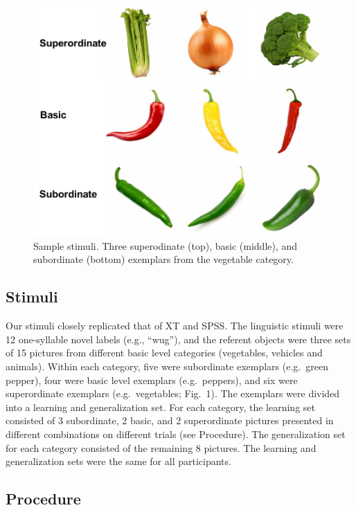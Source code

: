 \documentclass[english,floatsintext,man]{apa6}
\theoremstyle{definition}
\theoremstyle{definition}
\theoremstyle{remark}
\begin{document}
\begin{figure}[t!]
 
 {\centering \includegraphics[width=0.5\linewidth]{figs/stim} 
 
 }
 
 \caption{Sample stimuli. Three superodinate (top), basic (middle), and subordinate (bottom) exemplars from the vegetable category.}\label{fig:unnamed-chunk-1}
 \end{figure}

\subsection{Stimuli}\label{stimuli}

Our stimuli closely replicated that of XT and SPSS. The linguistic
stimuli were 12 one-syllable novel labels (e.g., \enquote{wug}), and the
referent objects were three sets of 15 pictures from different basic
level categories (vegetables, vehicles and animals). Within each
category, five were subordinate exemplars (e.g.~green pepper), four were
basic level exemplars (e.g.~peppers), and six were superordinate
exemplars (e.g.~vegetables; Fig.~1). The exemplars were divided into a
learning and generalization set. For each category, the learning set
consisted of 3 subordinate, 2 basic, and 2 superordinate pictures
presented in different combinations on different trials (see Procedure).
The generalization set for each category consisted of the remaining 8
pictures. The learning and generalization sets were the same for all
participants.

\subsection{Procedure}\label{procedure}
\end{document}
